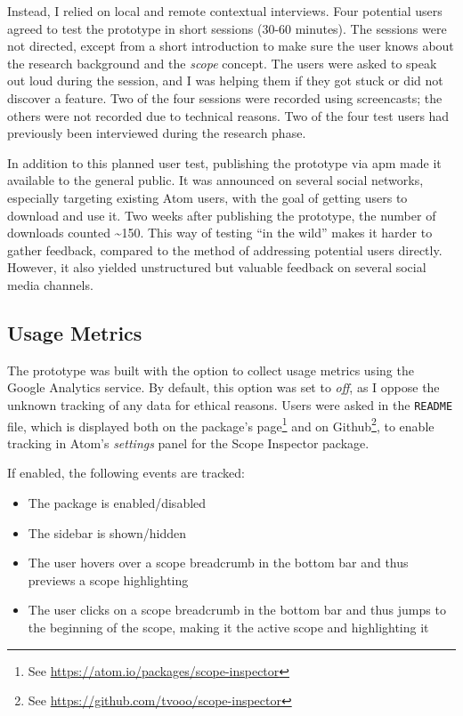 Instead, I relied on local and remote contextual interviews. Four
potential users agreed to test the prototype in short sessions (30-60
minutes). The sessions were not directed, except from a short
introduction to make sure the user knows about the research background
and the \emph{scope} concept. The users were asked to speak out loud
during the session, and I was helping them if they got stuck or did not
discover a feature. Two of the four sessions were recorded using
screencasts; the others were not recorded due to technical reasons. Two
of the four test users had previously been interviewed during the
research phase.

In addition to this planned user test, publishing the prototype via
\ac{apm} made it available to the general public. It was announced on
several social networks, especially targeting existing Atom users, with
the goal of getting users to download and use it. Two weeks after
publishing the prototype, the number of downloads counted
\textasciitilde{}150. This way of testing “in the wild” makes it harder
to gather feedback, compared to the method of addressing potential users
directly. However, it also yielded unstructured but valuable feedback on
several social media channels.

\subsection{Usage Metrics}\label{usage-metrics}

The prototype was built with the option to collect usage metrics using
the Google Analytics service. By default, this option was set to
\emph{off}, as I oppose the unknown tracking of any data for ethical
reasons. Users were asked in the \texttt{README} file, which is
displayed both on the package’s
page\footnote{See \url{https://atom.io/packages/scope-inspector}} and on
Github\footnote{See \url{https://github.com/tvooo/scope-inspector}}, to
enable tracking in Atom’s \emph{settings} panel for the Scope Inspector
package.

If enabled, the following events are tracked:

\begin{itemize}
\itemsep1pt\parskip0pt
\item
  The package is enabled/disabled
\item
  The sidebar is shown/hidden
\item
  The user hovers over a scope breadcrumb in the bottom bar and thus
  previews a scope highlighting
\item
  The user clicks on a scope breadcrumb in the bottom bar and thus jumps
  to the beginning of the scope, making it the active scope and
  highlighting it
\end{itemize}

